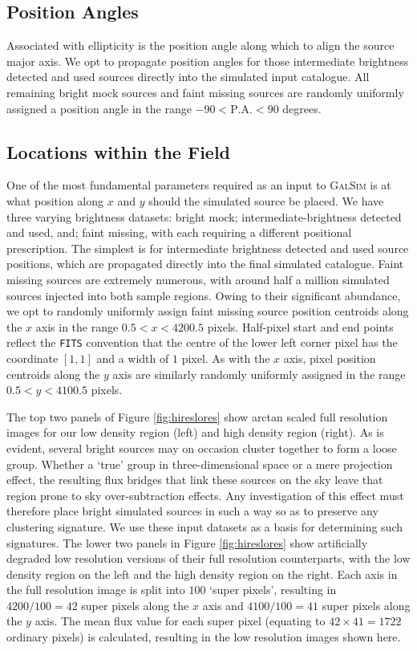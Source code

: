 \documentclass[fleqn,usenatbib,useAMS]{mnras}
\newcommand*{\GalSim}{\textsc{GalSim}\xspace}
\begin{document}
\subsection{Position Angles}
\label{sec:positionangle}

Associated with ellipticity is the position angle along which to align the source major axis. We opt to propagate position angles for those intermediate brightness detected and used sources directly into the simulated input catalogue. All remaining bright mock sources and faint missing sources are randomly uniformly assigned a position angle in the range $-90<\mathrm{P.A.}<90$ degrees. 

\subsection{Locations within the Field}
\label{sec:pixelposition}

One of the most fundamental parameters required as an input to \GalSim is at what position along $x$ and $y$ should the simulated source be placed. We have three varying brightness datasets: bright mock; intermediate-brightness detected and used, and; faint missing, with each requiring a different positional prescription. The simplest is for intermediate brightness detected and used source positions, which are propagated directly into the final simulated catalogue. Faint missing sources are extremely numerous, with around half a million simulated sources injected into both sample regions. Owing to their significant abundance, we opt to randomly uniformly assign faint missing source position centroids along the $x$ axis in the range $0.5<x<4200.5$ pixels. Half-pixel start and end points reflect the \texttt{FITS} convention that the centre of the lower left corner pixel has the coordinate $[1,1]$ and a width of $1$ pixel. As with the $x$ axis, pixel position centroids along the $y$ axis are similarly randomly uniformly assigned in the range $0.5<y<4100.5$ pixels. 

The top two panels of Figure \ref{fig:hireslores} show arctan scaled full resolution images for our low density region (left) and high density region (right). As is evident, several bright sources may on occasion cluster together to form a loose group. Whether a `true' group in three-dimensional space or a mere projection effect, the resulting flux bridges that link these sources on the sky leave that region prone to sky over-subtraction effects. Any investigation of this effect must therefore place bright simulated sources in such a way so as to preserve any clustering signature. We use these input datasets as a basis for determining such signatures. The lower two panels in Figure \ref{fig:hireslores} show artificially degraded low resolution versions of their full resolution counterparts, with the low density region on the left and the high density region on the right. Each axis in the full resolution image is split into $100$ `super pixels', resulting in $4200/100=42$ super pixels along the $x$ axis and $4100/100=41$ super pixels along the $y$ axis. The mean flux value for each super pixel (equating to $42\times41=1722$ ordinary pixels) is calculated, resulting in the low resolution images shown here. 
\end{document}

